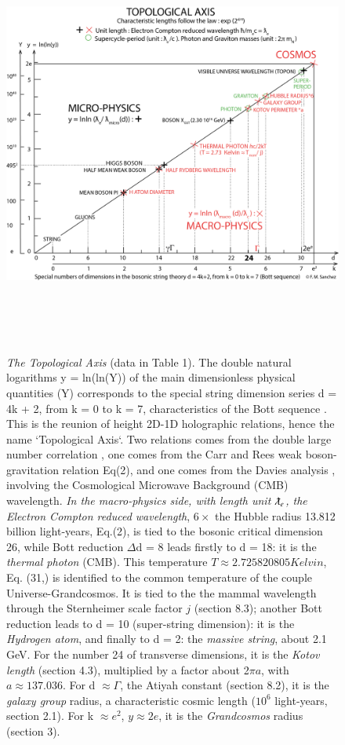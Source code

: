 \documentclass[a4paper,9pt]{article}
\begin{document}
\begin{figure}
\label{fig:7:fig1}
\centering
\includegraphics[width=\textwidth,height=14cm]{./figure/figure}
\caption{\textit{The Topological Axis} (data in Table 1). The double natural logarithms y = ln(ln(Y)) of the main dimensionless physical quantities (Y) corresponds to the special string dimension series d = 4k + 2, from k = 0 to k = 7, characteristics of the Bott sequence . This is the reunion of height 2D-1D holographic relations, hence the name `Topological Axis`. Two relations comes from the double large number correlation \cite{Eddington}, one comes from the Carr and Rees weak boson-gravitation relation Eq(2), and one comes from the Davies analysis , involving the Cosmological Microwave Background (CMB) wavelength. \textit{In the macro-physics side, with length unit $\lambdabar_e$, the Electron Compton reduced wavelength}, $6 \times$ the Hubble radius 13.812 billion light-years, Eq.(2), is tied to the bosonic critical dimension 26, while Bott reduction $\Delta$d = 8 leads firstly to  d = 18: it is the \textit{thermal photon} (CMB). This temperature $T \approx 2.725820805 Kelvin$, Eq. (31,) is identified to the common temperature of the couple Universe-Grandcosmos. It is tied to the the mammal wavelength through the Sternheimer scale factor $j$ (section 8.3); another Bott reduction leads to d = 10 (super-string dimension): it is the \textit{Hydrogen atom}, and finally to d = 2: the \textit{massive string}, about 2.1 GeV. For the number 24 of transverse dimensions, it is the \textit{Kotov length} (section 4.3), multiplied by a factor about 2$\pi a$, with $a \approx 137.036$. For d $\approx \Gamma$, the Atiyah constant (section 8.2), it is the \textit{galaxy group} radius, a characteristic cosmic length ($10^{6}$ light-years, section 2.1). For k $\approx e^{2}$, $y \approx 2e$, it is the \textit{Grandcosmos} radius (section 3). 
}
\end{figure}
\end{document}
